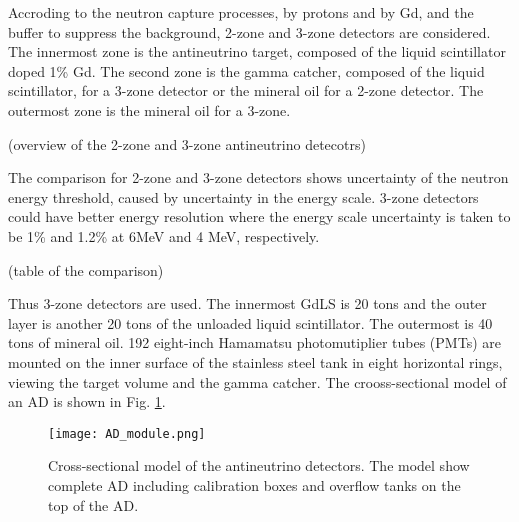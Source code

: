 Accroding to the neutron capture processes, by protons and by Gd, and the buffer to
suppress the background, 2-zone and 3-zone detectors are considered. The innermost
zone is the antineutrino target, composed of the liquid scintillator doped 1\% Gd.
The second zone is the gamma catcher, composed of the liquid scintillator, for a
3-zone detector or the mineral oil for a 2-zone detector. The outermost zone
is the mineral oil for a 3-zone.

(overview of the 2-zone and 3-zone antineutrino detecotrs)


The comparison for 2-zone and 3-zone detectors shows 
uncertainty of the neutron energy threshold, caused by uncertainty in the energy scale.
3-zone detectors could have better energy resolution where the energy scale
uncertainty is taken to be 1\% and 1.2\% at 6MeV and 4 MeV, respectively.

(table of the comparison)

Thus 3-zone detectors are used. The innermost GdLS is 20 tons and the outer layer is another
20 tons of the unloaded  liquid scintillator. The outermost is 40 tons of mineral oil. 192 eight-inch
Hamamatsu photomutiplier tubes (PMTs) are mounted on the inner surface of the stainless steel tank
in eight horizontal rings, viewing the target volume and the gamma catcher. The crooss-sectional model of an AD
is shown in Fig. \ref{fig:AD_module.png}.

\begin{figure}
    \centering
    \texttt{[image: AD\_module.png]}
    \caption{Cross-sectional model of the antineutrino detectors.
The model show complete AD including calibration boxes and overflow tanks on the top of the AD.}
    \label{fig:AD_module.png}
    \end{figure}





